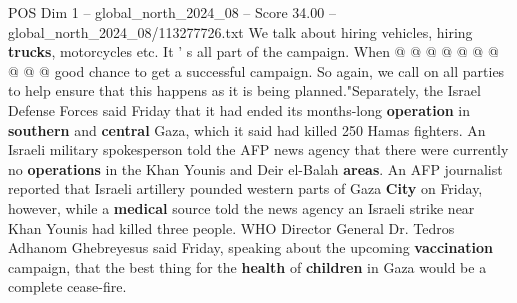 \begin{textsample}{POS Dim 1 – global\_north\_2024\_08 – Score 34.00 – global\_north\_2024\_08/113277726.txt}
We talk about hiring vehicles, hiring \textbf{trucks}, motorcycles etc.
It ' s all part of the campaign.
When @ @ @ @ @ @ @ @ @ @ good chance to get a successful campaign.
So again, we call on all parties to help ensure that this happens as it is being planned."Separately, the Israel Defense Forces said Friday that it had ended its months-long \textbf{operation} in \textbf{southern} and \textbf{central} Gaza, which it said had killed 250 Hamas fighters.
An Israeli military spokesperson told the AFP news agency that there were currently no \textbf{operations} in the Khan Younis and Deir el-Balah \textbf{areas}.
An AFP journalist reported that Israeli artillery pounded western parts of Gaza \textbf{City} on Friday, however, while a \textbf{medical} source told the news agency an Israeli strike near Khan Younis had killed three people.
WHO Director General Dr.
Tedros Adhanom Ghebreyesus said Friday, speaking about the upcoming \textbf{vaccination} campaign, that the best thing for the \textbf{health} of \textbf{children} in Gaza would be a complete cease-fire.

\end{textsample}
